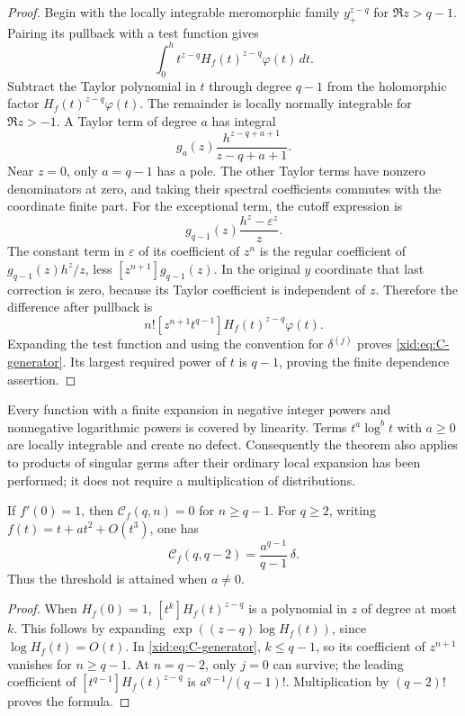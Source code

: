 \begin{proof}
Begin with the locally integrable meromorphic family
$y_+^{z-q}$ for $\Re z>q-1$.  Pairing its pullback with a test function
gives
\[
 \int_0^h t^{z-q}H_f(t)^{z-q}\varphi(t)\,dt.
\]
Subtract the Taylor polynomial in $t$ through degree $q-1$ from the
holomorphic factor $H_f(t)^{z-q}\varphi(t)$.  The remainder is locally
normally integrable for $\Re z>-1$.  A Taylor term of degree $a$ has
integral
\[
 g_a(z)\frac{h^{z-q+a+1}}{z-q+a+1}.
\]
Near $z=0$, only $a=q-1$ has a pole.  The other Taylor terms have
nonzero denominators at zero, and taking their spectral coefficients
commutes with the coordinate finite part.  For the exceptional term,
the cutoff expression is
\[
 g_{q-1}(z)\frac{h^z-\varepsilon^z}{z}.
\]
The constant term in $\varepsilon$ of its coefficient of $z^n$ is the
regular coefficient of $g_{q-1}(z)h^z/z$, less
$[z^{n+1}]g_{q-1}(z)$.  In the original $y$ coordinate that last
correction is zero, because its Taylor coefficient is independent of
$z$.  Therefore the difference after pullback is
\[
 n![z^{n+1}t^{q-1}]H_f(t)^{z-q}\varphi(t).
\]
Expanding the test function and using the convention for
$\delta^{(j)}$ proves \eqref{xid:eq:C-generator}.  Its largest required
power of $t$ is $q-1$, proving the finite dependence assertion.
\end{proof}

Every function with a finite expansion in negative integer powers and
nonnegative logarithmic powers is covered by linearity.  Terms
$t^a\log^b t$ with $a\ge0$ are locally integrable and create no defect.
Consequently the theorem also applies to products of singular germs
after their ordinary local expansion has been performed; it does not
require a multiplication of distributions.

\begin{corollary}
\label{xid:cor:monomial-threshold}
If $f'(0)=1$, then $\mathcal C_f(q,n)=0$ for $n\ge q-1$.
For $q\ge2$, writing $f(t)=t+a t^2+O(t^3)$, one has
\begin{equation}\label{xid:eq:monomial-top}
 \mathcal C_f(q,q-2)=\frac{a^{q-1}}{q-1}\,\delta.
\end{equation}
Thus the threshold is attained when $a\ne0$.
\end{corollary}

\begin{proof}
When $H_f(0)=1$, $[t^k]H_f(t)^{z-q}$ is a polynomial in $z$ of degree
at most $k$.  This follows by expanding
$\exp((z-q)\log H_f(t))$, since $\log H_f(t)=O(t)$.
In \eqref{xid:eq:C-generator}, $k\le q-1$, so its coefficient of
$z^{n+1}$ vanishes for $n\ge q-1$.  At $n=q-2$, only $j=0$ can
survive; the leading coefficient of $[t^{q-1}]H_f(t)^{z-q}$ is
$a^{q-1}/(q-1)!$.  Multiplication by $(q-2)!$ proves the formula.
\end{proof}

